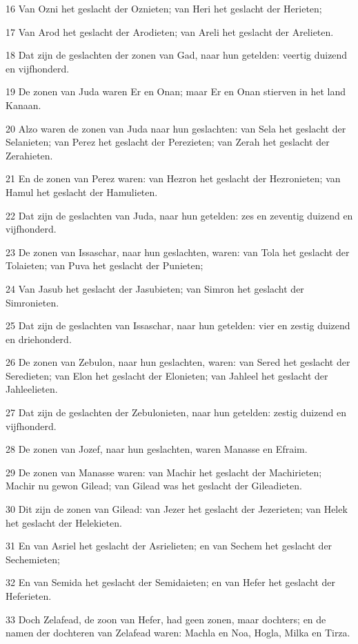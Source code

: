 \par 16 Van Ozni het geslacht der Oznieten; van Heri het geslacht der Herieten;
\par 17 Van Arod het geslacht der Arodieten; van Areli het geslacht der Arelieten.
\par 18 Dat zijn de geslachten der zonen van Gad, naar hun getelden: veertig duizend en vijfhonderd.
\par 19 De zonen van Juda waren Er en Onan; maar Er en Onan stierven in het land Kanaan.
\par 20 Alzo waren de zonen van Juda naar hun geslachten: van Sela het geslacht der Selanieten; van Perez het geslacht der Perezieten; van Zerah het geslacht der Zerahieten.
\par 21 En de zonen van Perez waren: van Hezron het geslacht der Hezronieten; van Hamul het geslacht der Hamulieten.
\par 22 Dat zijn de geslachten van Juda, naar hun getelden: zes en zeventig duizend en vijfhonderd.
\par 23 De zonen van Issaschar, naar hun geslachten, waren: van Tola het geslacht der Tolaieten; van Puva het geslacht der Punieten;
\par 24 Van Jasub het geslacht der Jasubieten; van Simron het geslacht der Simronieten.
\par 25 Dat zijn de geslachten van Issaschar, naar hun getelden: vier en zestig duizend en driehonderd.
\par 26 De zonen van Zebulon, naar hun geslachten, waren: van Sered het geslacht der Seredieten; van Elon het geslacht der Elonieten; van Jahleel het geslacht der Jahleelieten.
\par 27 Dat zijn de geslachten der Zebulonieten, naar hun getelden: zestig duizend en vijfhonderd.
\par 28 De zonen van Jozef, naar hun geslachten, waren Manasse en Efraim.
\par 29 De zonen van Manasse waren: van Machir het geslacht der Machirieten; Machir nu gewon Gilead; van Gilead was het geslacht der Gileadieten.
\par 30 Dit zijn de zonen van Gilead: van Jezer het geslacht der Jezerieten; van Helek het geslacht der Helekieten.
\par 31 En van Asriel het geslacht der Asrielieten; en van Sechem het geslacht der Sechemieten;
\par 32 En van Semida het geslacht der Semidaieten; en van Hefer het geslacht der Heferieten.
\par 33 Doch Zelafead, de zoon van Hefer, had geen zonen, maar dochters; en de namen der dochteren van Zelafead waren: Machla en Noa, Hogla, Milka en Tirza.
